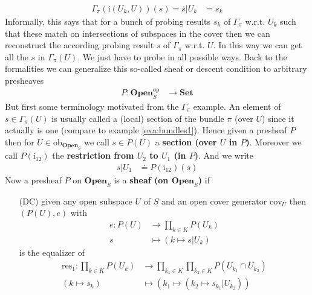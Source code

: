 \begin{exa}
\begin{align*}
  \Gamma_{\pi}(\mathrm{i}(U_{k},U))(s)
  =
  s
  \vert
  U_{k}
  &=
  s_{k}
\end{align*}
Informally, this says that for a bunch of probing results $s_{k}$ of $\Gamma_{\pi}$ w.r.t. $U_{k}$ such that these match on intersections of subspaces in the cover then we can reconstruct the according probing result $s$ of $\Gamma_{\pi}$ w.r.t. $U$. In this way we can get all the $s$ in $\Gamma_{\pi}(U)$. We just have to probe in all possible ways. Back to the formalities we can generalize this so-called sheaf or descent condition to arbitrary presheaves
\begin{align*}
  P
  \colon
  \mathbf{Open}_{S}^{\mathrm{op}}
  &\rightarrow
  \mathbf{Set}
\end{align*}
But first some terminology motivated from the $\Gamma_{\pi}$ example. An element of $s \in \Gamma_{\pi}(U)$ is usually called a (local) section of the bundle $\pi$ (over $U$) since it actually is one (compare to example \ref{exa:bundles1}). Hence given a presheaf $P$ then for $U \in \mathrm{ob}_{\mathbf{Open}_{S}}$ we call $s \in P(U)$ a \textbf{section (over $U$ in $P$)}. Moreover we call $P(\mathrm{i_{12}})$ the \textbf{restriction from $U_{2}$ to $U_{1}$ (in $P$)}. And we write
\begin{align*}
  s
  \vert
  U_{1}
  &\doteq
  P(\mathrm{i_{12}})(s)
\end{align*}
Now a presheaf $P$ on $\mathbf{Open}_{S}$ is a \textbf{sheaf (on $\mathbf{Open}_{S}$)} if
\begin{enumerate}
\item[(DC)]
given any open subspace $U$ of $S$ and an open cover generator $\mathrm{cov}_{U}$ then $(P(U),e)$ with
\begin{align*}
  e
  \colon
  P(U)
  &\rightarrow
  \prod_{k \in K}
  P(U_{k})
  \\
  s
  &\mapsto
  \left(
    k
    \mapsto
    s
    \vert
    U_{k}
  \right)
\end{align*}
is the equalizer of
\begin{align*}
  \mathrm{res}_{1}
  \colon
  \prod_{k \in K}
  P(U_{k})
  &\rightarrow
  \prod_{k_{1} \in K}
  \prod_{k_{2} \in K}
  P
  \left(
    U_{k_{1}}
    \cap
    U_{k_{2}}
  \right)
  \\
  \left(
    k
    \mapsto
    s_{k}
  \right)
  &\mapsto
  \left(
    k_{1}
    \mapsto
    \left(
      k_{2}
      \mapsto
      s_{k_{1}}
      \vert
      U_{k_{2}}
    \right)
  \right)
  \\\\

\end{align*}
\end{enumerate}
\end{exa}
